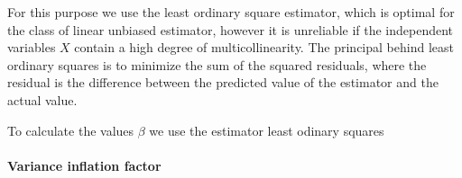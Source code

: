 For this purpose we use the least ordinary square estimator, which is optimal for the class of linear unbiased estimator, 
however it is unreliable if the independent variables $X$ contain a high degree of multicollinearity.
The principal behind least ordinary squares is to minimize the sum of the squared residuals, where the residual is the difference between
the predicted value of the estimator and the actual value. \cite{Linear-Regression}




To calculate the values $\beta$ we use the estimator least odinary squares

\paragraph{Variance inflation factor}
